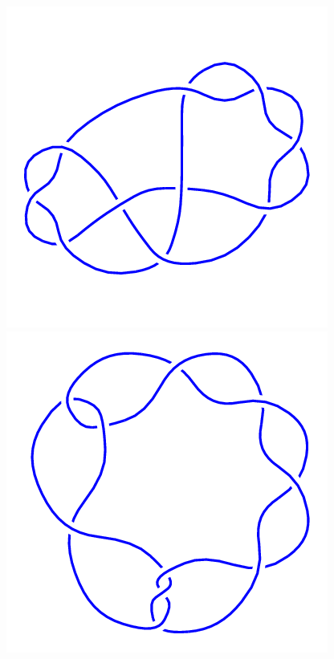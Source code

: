 \begin{figure}[H]
\begin{minipage}[b]{.18\linewidth}
	\end{minipage}
	\begin{minipage}[b]{.18\linewidth}
		\centering
		\includegraphics[width=\linewidth]{../data/10_19.png}
	\end{minipage}
	\begin{minipage}[b]{.18\linewidth}
		\centering
		\includegraphics[width=\linewidth]{../data/10_20.png}

\end{minipage}
\end{figure}
